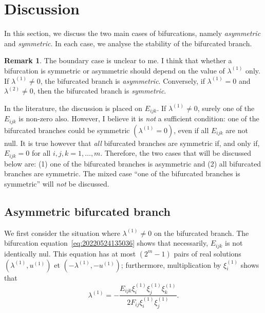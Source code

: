 \documentclass[12pt, final]{scrartcl}
\theoremstyle{definition}
\newtheorem{remark}{Remark}
\newcommand{\order}[2][1]{#2^{(#1)}}
\begin{document}
\section{Discussion}

In this section, we discuss the two main cases of bifurcations, namely \emph{asymmetric} and \emph{symmetric}. In each
case, we analyse the stability of the bifurcated branch.

\begin{remark}
  The boundary case is unclear to me. I think that whether a bifurcation is symmetric or asymmetric should depend on the
  value of $\order[1]\lambda$ only. If $\order[1]\lambda \neq 0$, the bifurcated branch is
  \emph{asymmetric}. Conversely, if $\order[1]\lambda = 0$ and $\order[2]\lambda \neq 0$, then the bifurcated branch is
  \emph{symmetric}.

  In the literature, the discussion is placed on $E_{ijk}$. If $\order[1]\lambda \neq 0$, surely one of the $E_{ijk}$ is
  non-zero also. However, I believe it is \emph{not} a sufficient condition: one of the bifurcated branches could be
  symmetric $(\order[1]\lambda = 0)$, even if all $E_{ijk}$ are not null. It is true however that \emph{all} bifurcated
  branches are symmetric if, and only if, $E_{ijk}=0$ for all $i, j, k = 1, \ldots, m$. Therefore, the two cases that
  will be discussed below are: (1) one of the bifurcated branches is asymmetric and (2) all bifurcated branches are
  symmetric. The mixed case ``one of the bifurcated branches is symmetric'' will \emph{not} be discussed.
\end{remark}

\subsection{Asymmetric bifurcated branch}

We first consider the situation where $\order[1]\lambda \neq 0$ on the bifurcated branch. The bifurcation
equation~\eqref{eq:20220524135036} shows that necessarily, $E_{ijk}$ is not identically nul. This equation has at most
$(2^m - 1)$ pairs of real solutions $(\order[1]\lambda, \order[1]u)$ et $(- \order[1]\lambda, - \order[1]u)$;
furthermore, multiplication by $\order[1]{\xi_i}$ shows that
\begin{equation}
  \label{eq:20220801085236}
  \order[1]\lambda = -\frac{E_{ijk} \order[1]{\xi_i} \order[1]{\xi_j} \order[1]{\xi_k}}{2 F_{ij} \order[1]{\xi_i} \order[1]{\xi_j}}.
\end{equation}
\end{document}
